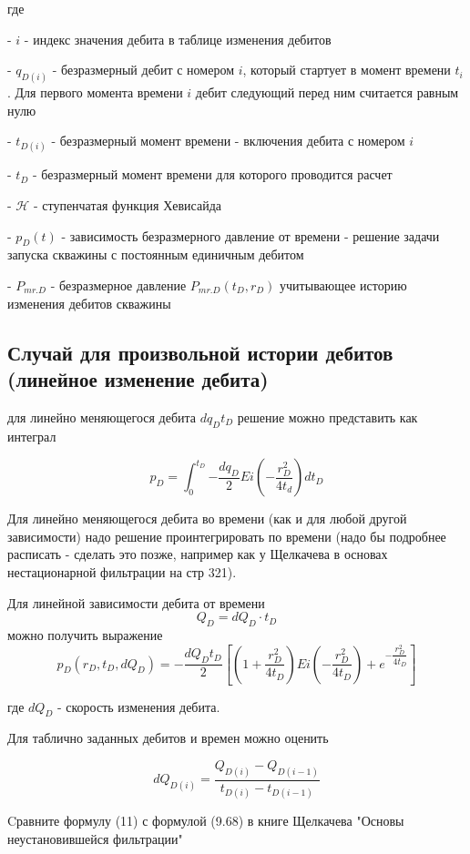 \documentclass[oneside, openany]{memoir}
\begin{document}
	где
	
	- $i$ - индекс значения дебита в таблице изменения дебитов
	
	- $q_{D(i)}$ - безразмерный дебит с номером $i$, который стартует в момент времени $t_i$. Для первого момента времени $i$ дебит следующий перед ним считается равным нулю
	
	- $t_{D(i)}$ - безразмерный момент времени - включения дебита с номером $i$
	
	- $t_{D}$ - безразмерный момент времени для которого проводится расчет
	
	- $\mathcal{H}$ - ступенчатая функция Хевисайда
	
	- $p_D\left(t\right)$ - зависимость безразмерного давление от времени - решение задачи запуска скважины с постоянным единичным дебитом
	
	- $P_{mr.D} $ - безразмерное давление $P_{mr.D}(t_D, r_D)$ учитывающее историю изменения дебитов скважины
	
	\subsection{Случай для произвольной истории дебитов (линейное изменение дебита)}
	
	для линейно меняющегося дебита $dq_D t_D$ решение можно представить как интеграл
	
	$$
	p_D = \int_0^{t_D}{- \frac{dq_D}{2} Ei \left(- \dfrac{ r_D^2}{4t_d} \right) dt_D}
	$$
	
	
	
	Для линейно меняющегося дебита во времени (как и для любой другой зависимости) надо решение проинтегрировать по времени (надо бы подробнее расписать - сделать это позже, например как у Щелкачева в основах нестационарной фильтрации на стр 321).
	
	Для линейной зависимости дебита от времени 
	$$
	Q_D = dQ_D \cdot t_D 
	$$
	можно получить выражение
	$$
	p_D(r_D,t_D, dQ_D) =-\frac{dQ_D t_D }{2} \left[ \left( 1+ \frac{r_D^2}{4 t_D} \right) Ei \left(- \dfrac{r_D^2}{4t_D} \right) + e^{-\dfrac{r_D^2}{4t_D}} \right] $$ 
	
	где $dQ_D$ - скорость изменения дебита.
	
	Для таблично заданных дебитов и времен можно оценить 
	
	$$
	dQ_{D(i)} = \dfrac{Q_{D(i)}-Q_{D(i-1)}}{t_{D(i)} - t_{D(i-1)} } 
	$$
	
	Cравните формулу (11) с формулой (9.68) в книге Щелкачева "Основы неустановившейся фильтрации"
	
\end{document}
